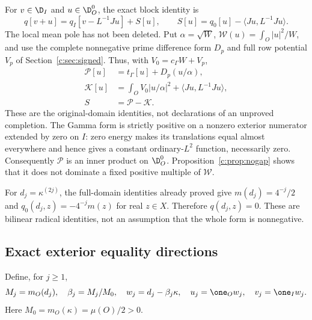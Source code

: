 \documentclass[11pt,a4paper]{article}
\numberwithin{equation}{section}
\theoremstyle{definition}\newtheorem{definition}[theorem]{Definition}
\theoremstyle{remark}\newtheorem{remark}[theorem]{Remark}
\newcommand{\ip}[2]{\langle#1,#2\rangle}\newcommand{\norm}[1]{\lVert#1\rVert}\newcommand{\abs}[1]{\lvert#1\rvert}
\begin{document}
For $v\in\D_I$ and $u\in\D_O^0$, the exact block identity is
\begin{equation}\label{ext:eq:S}
 q[v+u]=q_I[v-L^{-1}Ju]+S[u],\qquad
 S[u]=q_0[u]-\ip{Ju}{L^{-1}Ju}.
\end{equation}
The local mean pole has not been deleted. Put $\alpha=\sqrt W$, $\mathcal W(u)=\int_O|u|^2/W$, and use the complete nonnegative prime difference form $D_p$ and full row potential $V_p$ of Section~\ref{c:sec:signed}. Thus, with $V_0=c_\Gamma W+V_p$,
\begin{align}
 \mathcal P[u]&=t_\Gamma[u]+D_p(u/\alpha),\label{ext:eq:P}\\
 \mathcal K[u]&=\int_O V_0|u/\alpha|^2+\ip{Ju}{L^{-1}Ju},\label{ext:eq:K}\\
 S&=\mathcal P-\mathcal K.\label{ext:eq:PK}
\end{align}
These are the original-domain identities, not declarations of an unproved completion. The Gamma form is strictly positive on a nonzero exterior numerator extended by zero on $I$: zero energy makes its translations equal almost everywhere and hence gives a constant ordinary-$L^2$ function, necessarily zero. Consequently $\mathcal P$ is an inner product on $\D_O^0$. Proposition~\ref{c:prop:nogap} shows that it does not dominate a fixed positive multiple of $\mathcal W$.

For $d_j=\kappa^{(2j)}$, the full-domain identities already proved give $m(d_j)=4^{-j}/2$ and $q_0(d_j,z)=-4^{-j}m(z)$ for real $z\in X$. Therefore $q(d_j,z)=0$. These are bilinear radical identities, not an assumption that the whole form is nonnegative.

\subsection{Exact exterior equality directions}
Define, for $j\ge1$,
\begin{equation}\label{ext:eq:uj}
 M_j=m_O(d_j),\quad \beta_j=M_j/M_0,\quad
 w_j=d_j-\beta_j\kappa,\quad
 u_j=\one_Ow_j,\quad v_j=\one_Iw_j.
\end{equation}
Here $M_0=m_O(\kappa)=\mu(O)/2>0$.
\end{document}
